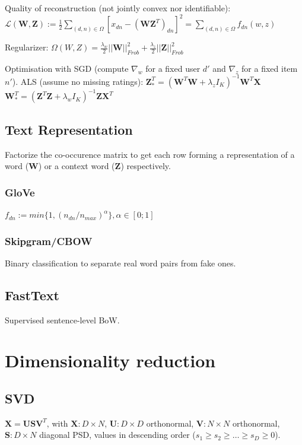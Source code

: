 Quality of reconstruction (not jointly convex nor identifiable):\newline $\mathcal{L}(\mathbf{W}, \mathbf{Z}) := \frac{1}{2} \underset{(d,n)\in \Omega}{\sum} [x_{dn} - (\mathbf{W}\mathbf{Z}^T)_{dn}]^2 = \underset{(d,n)\in \Omega}{\sum} f_{dn}(w,z)$

Regularizer: $\Omega(W,Z) = \frac{\lambda_w}{2} ||\mathbf{W}||^2_{Frob} + \frac{\lambda_z}{2} ||\mathbf{Z}||^2_{Frob}$

Optimisation with SGD (compute $\nabla_w$ for a fixed user $d'$ and $\nabla_z$ for a fixed item $n'$). ALS (assume no missing ratings):
$\mathbf{Z}^T_* = (\mathbf{W}^T\mathbf{W} + \lambda_z I_K)^{-1} \mathbf{W}^T \mathbf{X}$
$\mathbf{W}^T_* = (\mathbf{Z}^T\mathbf{Z} + \lambda_w I_K)^{-1} \mathbf{Z} \mathbf{X}^T$

\subsection{Text Representation}
Factorize the co-occurence matrix to get each row forming a representation of a word ($\mathbf{W}$) or a context word ($\mathbf{Z}$) respectively.
\subsubsection{GloVe}
$f_{dn} := min\{1,(n_{dn}/n_{max})^\alpha\}, \alpha \in [0;1]$
\subsubsection{Skipgram/CBOW}
Binary classification to separate real word pairs from fake ones.
\subsection{FastText}
Supervised sentence-level BoW.

\section{Dimensionality reduction}
\subsection{SVD}
$\mathbf{X} = \mathbf{U} \mathbf{S} \mathbf{V}^T$, with $\mathbf{X}: D\times N$, $\mathbf{U}: D\times D$ orthonormal, $\mathbf{V}: N\times N$ orthonormal, $\mathbf{S}: D\times N$ diagonal PSD, values in descending order ($s_1 \ge s_2 \ge \dots \ge s_D \ge 0$).

